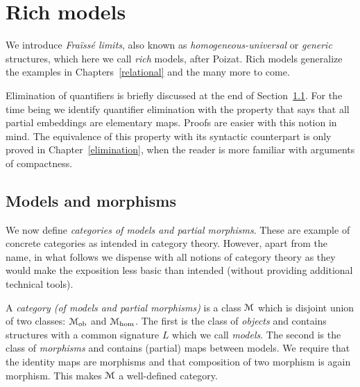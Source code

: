 \chapter{Rich models}
\label{fraisse} 

\def\ceq#1#2#3{\parbox[b]{20ex}{$\displaystyle #1$}\parbox[b]{4ex}{\hfil$#2$}$\displaystyle #3$}

We introduce \textit{Fra\"iss\'e limits}, also known as \textit{homogeneous-universal\/} or \textit{generic\/} structures, which here we call \textit{rich\/} models, after Poizat.
Rich models generalize the examples in Chapters~\ref{relational} and the many more to come.

Elimination of quantifiers is briefly discussed at the end of Section~\ref{rich}.
For the time being we identify  quantifier elimination with the property that says that all partial embeddings are elementary maps.
Proofs are easier with this notion in mind.
The equivalence of this property with its syntactic counterpart is only proved in Chapter~\ref{elimination}, when the reader is more familiar with arguments of compactness.

\section{Models and morphisms}\label{rich}
We now define \textit{categories of models and partial morphisms}.
These are example of concrete categories as intended in category theory.
However, apart from the name, in what follows we dispense with all notions of category theory as they would make the exposition less basic than intended (without providing additional technical tools).



A \emph{category (of models and partial morphisms)\/} is a class $\EuScript M$ which is disjoint union of two classes: \emph{$\EuScript M_{\textrm{ob}}$} and \emph{$\EuScript M_{\textrm{hom}}$}.
The first is the class of \emph{objects\/} and contains structures with a common signature $L$ which we call \emph{models}.
The second is the class of \emph{morphisms\/} and contains (partial) maps between models.
We require that the identity maps are morphisms and that composition of two morphism is again morphism.
This makes $\EuScript M$ a well-defined category.


